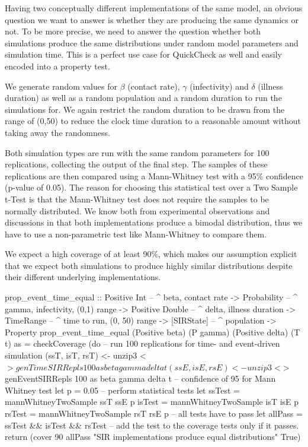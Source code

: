 Having two conceptually different implementations of the same model, an obvious question we want to answer is whether they are producing the same dynamics or not. To be more precise, we need to answer the question whether both simulations produce the same distributions under random model parameters and simulation time. This is a perfect use case for QuickCheck as well and easily encoded into a property test.

We generate random values for $\beta$ (contact rate), $\gamma$ (infectivity) and $\delta$ (illness duration) as well as a random population and a random duration to run the simulations for. We again restrict the random duration to be drawn from the range of (0,50) to reduce the clock time duration to a reasonable amount without taking away the randomness.

Both simulation types are run with the same random parameters for 100 replications, collecting the output of the final step. The samples of these replications are then compared using a Mann-Whitney test with a 95\% confidence (p-value of 0.05). The reason for choosing this statistical test over a Two Sample t-Test is that the Mann-Whitney test does not require the samples to be normally distributed. We know both from experimental observations and discussions in \cite{macal_agent-based_2010} that both implementations produce a bimodal distribution, thus we have to use a non-parametric test like Mann-Whitney to compare them.


We expect a high coverage of at least 90\%, which makes our assumption explicit that we expect both simulations to produce highly similar distributions despite their different underlying implementations.

\begin{HaskellCode}
prop_event_time_equal :: Positive Int    -- ^ beta, contact rate
                      -> Probability     -- ^ gamma, infectivity, (0,1) range
                      -> Positive Double -- ^ delta, illness duration
                      -> TimeRange       -- ^ time to run, (0, 50) range
                      -> [SIRState]      -- ^ population 
                      -> Property
prop_event_time_equal
    (Positive beta) (P gamma) (Positive delta) (T t) as = checkCoverage (do
  -- run 100 replications for time- and event-driven simulation
  (ssT, isT, rsT) <- unzip3 <$> genTimeSIRRepls 100 as beta gamma delta t
  (ssE, isE, rsE) <- unzip3 <$> genEventSIRRepls 100 as beta gamma delta t
  -- confidence of 95 for Mann Whitney test
  let p = 0.05
  -- perform statistical tests
  let ssTest = mannWhitneyTwoSample ssT ssE p
      isTest = mannWhitneyTwoSample isT isE p
      rsTest = mannWhitneyTwoSample rsT rsE p
  -- all tests have to pass
  let allPass = ssTest && isTest && rsTest 
  -- add the test to the coverage tests only if it passes.
  return 
    (cover 90 allPass "SIR implementations produce equal distributions" True)
\end{HaskellCode}

